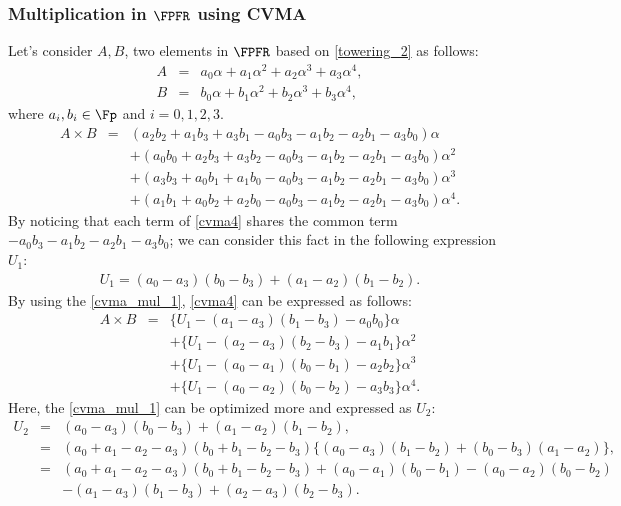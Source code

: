 \subsubsection{Multiplication in $\FPFR$ using CVMA}
Let's consider $A,B$, two elements in $ \FPFR$ based on \eqref{towering_2} as follows:
\begin{eqnarray*}
	A&=&a_0\alpha+a_1\alpha^2+a_2\alpha^3+a_3\alpha^4,\\
	B&=&b_0\alpha+b_1\alpha^2+b_2\alpha^3+b_3\alpha^4,
\end{eqnarray*}
where $a_i, b_i \in \Fp$ and $i={0,1,2,3}$.
\begin{eqnarray}
A\!\times\!B&= &(a_2b_2\!+a_1b_3\!+a_3b_1\!-a_0b_3\!-a_1b_2-a_2b_1\!-a_3b_0)\alpha \nonumber\\
&&+(a_0b_0\!+a_2b_3\!+a_3b_2\!-a_0b_3\!-a_1b_2-a_2b_1\!-a_3b_0)\alpha^2 \nonumber\\
&&+(a_3b_3\!+a_0b_1\!+a_1b_0\!-a_0b_3\!-a_1b_2-a_2b_1\!-a_3b_0)\alpha^3 \nonumber\\
&&+(a_1b_1\!+a_0b_2\!+a_2b_0\!-a_0b_3\!-a_1b_2-a_2b_1\!-a_3b_0)\alpha^4. \label{cvma4}
\end{eqnarray}
By noticing that each term of \eqref{cvma4}  shares the common term $-a_0b_3-a_1b_2-a_2b_1-a_3b_0$; we can  consider this fact in the following expression $U_1$:
\begin{eqnarray}
U_1=(a_0-a_3)(b_0-b_3)+(a_1-a_2)(b_1-b_2)\label{cvma_mul_1}.
\end{eqnarray}
By using the \eqref{cvma_mul_1}, \eqref{cvma4} can be expressed as follows:
\begin{eqnarray}\label{cvma5}
A\!\times\!B&=&\{U_1-(a_1-a_3)(b_1-b_3)-a_0b_0\}\alpha\nonumber\\
&&+\{U_1-(a_2-a_3)(b_2-b_3)-a_1b_1\}\alpha^2\nonumber\\
&&+\{U_1-(a_0-a_1)(b_0-b_1)-a_2b_2\}\alpha^3\nonumber\\
&&+\{U_1-(a_0-a_2)(b_0-b_2)-a_3b_3\}\alpha^4.
\end{eqnarray}
Here, the \eqref{cvma_mul_1} can be optimized more and expressed as $U_2$:
\begin{eqnarray*}
U_2&=&(a_0-a_3)(b_0-b_3)+(a_1-a_2)(b_1-b_2),\\
&=&(a_0+a_1-a_2-a_3)(b_0+b_1-b_2-b_3)\{(a_0-a_3)(b_1-b_2)+(b_0-b_3)(a_1-a_2)\},\\
&=&(a_0+a_1-a_2-a_3)(b_0+b_1-b_2-b_3)+(a_0-a_1)(b_0-b_1)-(a_0-a_2)(b_0-b_2)\\
&&-(a_1-a_3)(b_1-b_3)+(a_2-a_3)(b_2-b_3).
\end{eqnarray*}
